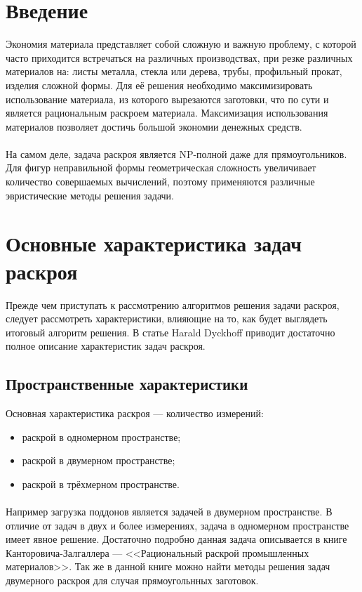 \documentclass[14pt]{extarticle}
\begin{document}
	\section{Введение}
	Экономия материала представляет собой сложную и важную проблему, с которой
	часто приходится встречаться на различных производствах, при резке различных материалов на: листы металла, стекла или дерева, трубы, профильный прокат, изделия сложной формы. Для её решения необходимо максимизировать использование материала, из которого вырезаются заготовки, что по сути и является рациональным раскроем материала. Максимизация использования материалов позволяет достичь большой экономии денежных средств.
	\paragraph{}
	На самом деле, задача раскроя является NP-полной даже для прямоугольников. Для
	фигур неправильной формы геометрическая сложность увеличивает количество совершаемых вычислений, поэтому применяются различные эвристические методы решения задачи.
	\newpage
	\section{Основные характеристика задач раскроя}
	Прежде чем приступать к рассмотрению алгоритмов решения задачи раскроя, следует рассмотреть характеристики, влияющие на то, как будет выглядеть итоговый алгоритм решения. В статье \cite{Dyckhoff} Harald Dyckhoff приводит достаточно полное описание характеристик задач раскроя.
	\subsection{Пространственные характеристики}
	Основная характеристика раскроя --- количество измерений:
	\begin{itemize}
		\item раскрой в одномерном пространстве;
		\item раскрой в двумерном пространстве;
		\item раскрой в трёхмерном пространстве.
	\end{itemize}
	\paragraph{}
	Например загрузка поддонов является задачей в двумерном пространстве. В отличие от 	задач в двух и более измерениях, задача в одномерном пространстве имеет явное решение. Достаточно подробно данная задача описывается в книге \cite{Cantorovich} Канторовича-Залгаллера --- <<Рациональный раскрой промышленных материалов>>. Так же в данной книге можно найти методы решения задач двумерного раскроя для случая прямоугольнных заготовок.
\end{document}
